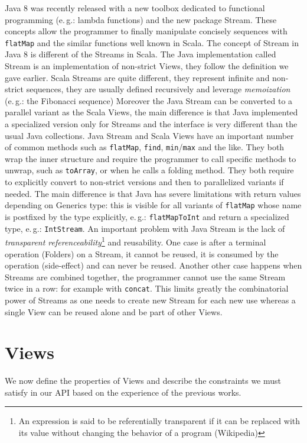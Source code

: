 \documentclass[a4paper,12pt,twocolumn]{article}
\newcommand{\eg}{e.\,g.}
\begin{document}
Java 8 was recently released with a new toolbox dedicated to functional programming (\eg: lambda functions) and the new package Stream.
These concepts allow the programmer to finally manipulate concisely sequences with \verb|flatMap| and the similar functions well known in Scala.
The concept of Stream in Java 8 is different of the Streams in Scala.
The Java implementation called Stream is an implementation of non-strict Views, they follow the definition we gave earlier.
Scala Streams are quite different, they represent infinite and non-strict sequences, they are usually defined recursively and leverage {\it memoization} (\eg: the Fibonacci sequence)
Moreover the Java Stream can be converted to a parallel variant as the Scala Views, the main difference is that Java implemented a specialized version only for Streams and the interface is very different than the usual Java collections.
Java Stream and Scala Views have an important number of common methods such as \verb|flatMap|, \verb|find|, \verb|min|/\verb|max| and the like.
They both wrap the inner structure and require the programmer to call specific methods to unwrap, such as \verb|toArray|, or when he calls a folding method.
They both require to explicitly convert to non-strict versions and then to parallelized variants if needed.
The main difference is that Java has severe limitations with return values depending on Generics type: this is visible for all variants of \verb|flatMap| whose name is postfixed by the type explicitly, \eg: \verb|flatMapToInt| and return a specialized type, \eg: \verb|IntStream|.
An important problem with Java Stream is the lack of {\it transparent referenceability}\footnote{An expression is said to be referentially transparent if it can be replaced with its value without changing the behavior of a program (Wikipedia)} and reusability.
One case is after a terminal operation (Folders) on a Stream, it cannot be reused, it is consumed by the operation (side-effect) and can never be reused.
Another other case happens when Streams are combined together, the programmer cannot use the same Stream twice in a row: for example with \verb|concat|.
This limits greatly the combinatorial power of Streams as one needs to create new Stream for each new use whereas a single View can be reused alone and be part of other Views.

\section{Views}
We now define the properties of Views and describe the constraints we must satisfy in our API based on the experience of the previous works.
\end{document}
